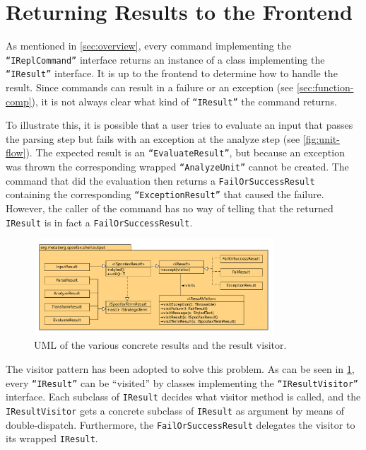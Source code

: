 \section{Returning Results to the Frontend}
\label{sec:visitor}

As mentioned in \cref{sec:overview}, every command implementing the
\texttt{``IReplCommand''} interface returns an instance of a class implementing
the \texttt{``IResult''} interface. It is up to the frontend to determine how to
handle the result. Since commands can result in a failure or an exception (see
\cref{sec:function-comp}), it is not always clear what kind of
\texttt{``IResult''} the command returns.

To illustrate this, it is possible that a user tries to evaluate an input that
passes the parsing step but fails with an exception at the analyze step (see
\cref{fig:unit-flow}). The expected result is an \texttt{``EvaluateResult''},
but because an exception was thrown the corresponding wrapped
\texttt{``AnalyzeUnit''} cannot be created. The command that did the evaluation
then returns a \texttt{FailOrSuccessResult} containing the corresponding
\texttt{``ExceptionResult''} that caused the failure. However, the caller of the
command has no way of telling that the returned \texttt{IResult} is in fact a
\texttt{FailOrSuccessResult}.

\begin{figure}[t]
  \centering
  \includegraphics[width=0.8\textwidth]{uml-visitor}
  \caption{UML of the various concrete results and the result visitor.}
  \label{fig:uml-visitor}
\end{figure}

The visitor pattern has been adopted to solve this problem. As can be seen in
\cref{fig:uml-visitor}, every \texttt{``IResult''} can be ``visited'' by classes
implementing the \texttt{``IResultVisitor''} interface. Each subclass of
\texttt{IResult} decides what visitor method is called, and the
\texttt{IResultVisitor} gets a concrete subclass of \texttt{IResult} as argument
by means of double-dispatch. Furthermore, the \texttt{FailOrSuccessResult}
delegates the visitor to its wrapped \texttt{IResult}.

